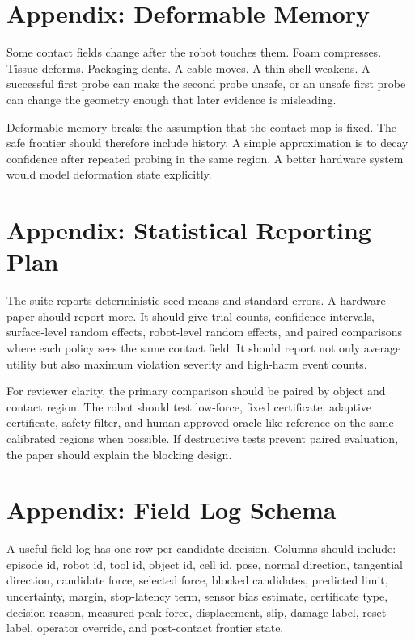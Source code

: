 \documentclass{article}
\begin{document}
\section{Appendix: Deformable Memory}

Some contact fields change after the robot touches them. Foam compresses.
Tissue deforms. Packaging dents. A cable moves. A thin shell weakens. A
successful first probe can make the second probe unsafe, or an unsafe first
probe can change the geometry enough that later evidence is misleading.

Deformable memory breaks the assumption that the contact map is fixed. The
safe frontier should therefore include history. A simple approximation is to
decay confidence after repeated probing in the same region. A better hardware
system would model deformation state explicitly.

\section{Appendix: Statistical Reporting Plan}

The suite reports deterministic seed means and standard errors. A hardware
paper should report more. It should give trial counts, confidence intervals,
surface-level random effects, robot-level random effects, and paired
comparisons where each policy sees the same contact field. It should report
not only average utility but also maximum violation severity and high-harm
event counts.

For reviewer clarity, the primary comparison should be paired by object and
contact region. The robot should test low-force, fixed certificate, adaptive
certificate, safety filter, and human-approved oracle-like reference on the
same calibrated regions when possible. If destructive tests prevent paired
evaluation, the paper should explain the blocking design.

\section{Appendix: Field Log Schema}

A useful field log has one row per candidate decision. Columns should include:
episode id, robot id, tool id, object id, cell id, pose, normal direction,
tangential direction, candidate force, selected force, blocked candidates,
predicted limit, uncertainty, margin, stop-latency term, sensor bias estimate,
certificate type, decision reason, measured peak force, displacement, slip,
damage label, reset label, operator override, and post-contact frontier state.
\end{document}
